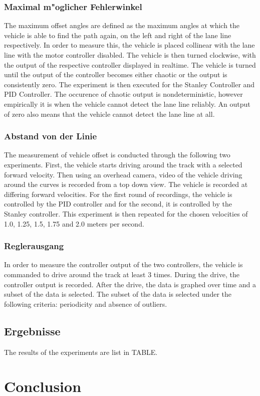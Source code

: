 \documentclass[arbeit=studie,oneside,BCOR=12mm]{ArbeitRST}
\begin{document}
\subsection{Maximal m"oglicher Fehlerwinkel}
The maximum offset angles are defined as the maximum angles at which the
vehicle is able to find the path again, on the left and right of the lane line
respectively. In order to measure this, the vehicle is placed collinear with
the lane line with the motor controller disabled. The vehicle is then turned
clockwise, with the output of the respective controller displayed in realtime.
The vehicle is turned until the output of the controller becomes either chaotic
or the output is consistently zero. The experiment is then executed for the
Stanley Controller and PID Controller. The occurence of chaotic output is
nondeterministic, however empirically it is when the vehicle cannot detect the
lane line reliably. An output of zero also means that the vehicle cannot detect
the lane line at all.

\subsection{Abstand von der Linie} The measurement of vehicle offset is
conducted through the following two experiments. First, the vehicle starts
driving around the track with a selected forward velocity. Then using an
overhead camera, video of the vehicle driving around the curves is recorded
from a top down view. The vehicle is recorded at differing forward velocities.
For the first round of recordings, the vehicle is controlled by the PID
controller and for the second, it is controlled by the Stanley controller. This
experiment is then repeated for the chosen velocities of 1.0, 1.25, 1.5, 1.75
and 2.0 meters per second.

\subsection{Reglerausgang}
In order to measure the controller output of the two controllers, the vehicle
is commanded to drive around the track at least 3 times. During the drive, the
controller output is recorded. After the drive, the data is graphed over time
and a subset of the data is selected. The subset of the data is selected under
the following criteria: periodicity and absence of outliers.

\section{Ergebnisse}
The results of the experiments are list in TABLE. 


\chapter{Conclusion}
\end{document}
